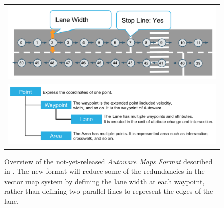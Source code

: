 \documentclass[12pt,twoside]{article}
\begin{document}
\begin{figure}
\centering
\begin{tabular}{c}
  \includegraphics[width=120mm]{amf2.png} \\
  \includegraphics[width=150mm]{amf1.png}
\end{tabular}
\caption{Overview of the not-yet-released \textit{Autoware Maps Format} described in \cite{AutowareMaps2}. The new format will reduce some of the redundancies in the vector map system by defining the lane width at each waypoint, rather than defining two parallel lines to represent the edges of the lane.}
\label{fig:amf}
\end{figure}
\end{document}
